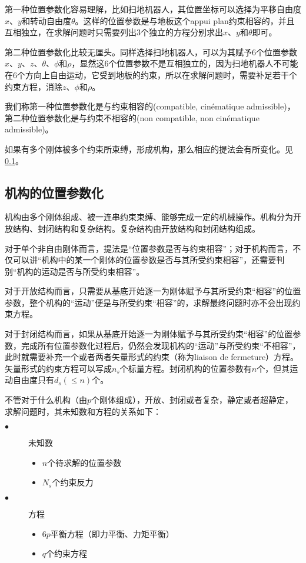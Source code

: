 \documentclass[UTF8]{ctexart}%
\begin{document}
第一种位置参数化容易理解，比如扫地机器人，其位置坐标可以选择为平移自由度$x$、$y$和转动自由度$\theta$。这样的位置参数是与地板这个appui plan约束相容的，并且互相独立，在求解问题时只需要列出3个独立的方程分别求出$x$、$y$和$\theta$即可。

第二种位置参数化比较无厘头。同样选择扫地机器人，可以为其赋予6个位置参数$x$、$y$、$z$、$\theta$、$\phi$和$\rho$，显然这6个位置参数不是互相独立的，因为扫地机器人不可能在6个方向上自由运动，它受到地板的约束，所以在求解问题时，需要补足若干个约束方程，消除$z$、$\phi$和$\rho$。

我们称第一种位置参数化是与约束相容的(compatible, cinématique admissible)，第二种位置参数化是与约束不相容的(non compatible, non cinématique admissible)。

如果有多个刚体被多个约束所束缚，形成机构，那么相应的提法会有所变化。见\cref{sec:机构的位置参数化}。

\subsection{机构的位置参数化}
\label{sec:机构的位置参数化}
机构由多个刚体组成、被一连串约束束缚、能够完成一定的机械操作。机构分为开放结构、封闭结构和复杂结构。复杂结构由开放结构和封闭结构组成。

对于单个非自由刚体而言，提法是“位置参数是否与约束相容”；对于机构而言，不仅可以讲“机构中的某一个刚体的位置参数是否与其所受约束相容”，还需要判别“机构的运动是否与所受约束相容”。

对于开放结构而言，只需要从基底开始逐一为刚体赋予与其所受约束“相容”的位置参数，整个机构的“运动”便是与所受约束“相容”的，求解最终问题时亦不会出现约束方程。

对于封闭结构而言，如果从基底开始逐一为刚体赋予与其所受约束“相容”的位置参数，完成所有位置参数化过程后，仍然会发现机构的“运动”与所受约束“不相容”，此时就需要补充一个或者两者矢量形式的约束（称为liaison de fermeture）方程。矢量形式的约束方程可以写成$n_s$个标量方程。封闭机构的位置参数有$n$个，但其运动自由度只有$d_s (\le n)$个。

不管对于什么机构（由$p$个刚体组成），开放、封闭或者复杂，静定或者超静定，求解问题时，其未知数和方程的关系如下：
\begin{description}
	\item[$\bullet$] 未知数
	\begin{itemize}
		\item $n$个待求解的位置参数
		\item $N_s$个约束反力
	\end{itemize}
	\item[$\bullet$] 方程
	\begin{itemize}
		\item $6p$平衡方程（即力平衡、力矩平衡）
		\item $q$个约束方程
	\end{itemize}
\end{description}
\end{document}
